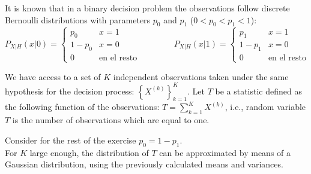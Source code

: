 \else

It is known that in a binary decision problem the observations follow discrete Bernoulli distributions with parameters $p_0$ and $p_1$ ($0 < p_0 < p_1 < 1$):
$$
P_{X|H}(x|0) = \left\{ \begin{array}{ll}  
					   p_0 & x=1 \\ 1-p_0 & x=0 \\0 & \mbox{en el resto}	
					   \end{array}  \right.
\qquad \qquad 
P_{X|H}(x|1) = \left\{ \begin{array}{ll}  
					   p_1 & x=1 \\ 1-p_1 & x=0 \\0 & \mbox{en el resto}
					   \end{array}  \right.
$$		    
					    
We have access to a set of $K$ independent observations taken under the same hypothesis for the decision process: $\left\{ X^{(k)} \right\}_{k=1}^K$. Let $T$ be a statistic defined as the following function of the observations:  $T=\sum_{k=1}^K X^{(k)}$, i.e., random variable $T$ is the number of observations which are equal to one.
Consider for the rest of the exercise $p_0 =1 - p_1$. \\
For $K$ large enough, the distribution of $T$ can be approximated by means of a Gaussian distribution, using the previously calculated means and variances.
